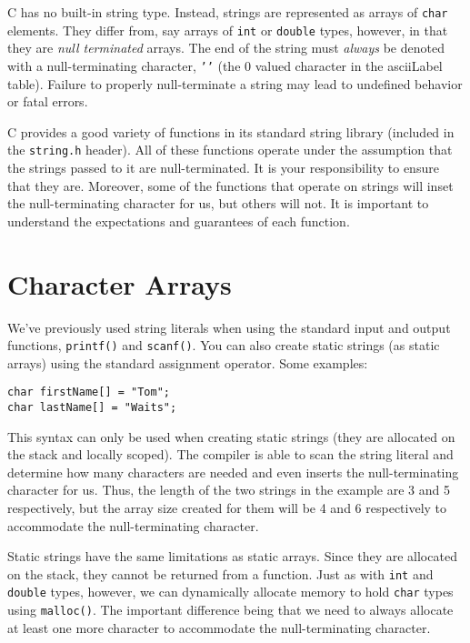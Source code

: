 

C has no built-in string type.  Instead, strings are represented
as arrays of \texttt{char} elements.  They differ from, say
arrays of \texttt{int} or \texttt{double} types, however,
in that they are \emph{null terminated} arrays.  The end of the
string must \emph{always} be denoted with a null-terminating 
character, \texttt{'\0'} (the 0 valued character in the \gls{asciiLabel}
table).  Failure to properly null-terminate a string may lead
to undefined behavior or fatal errors.  

C provides a good variety of functions in its standard string library
(included in the \texttt{string.h} header).  All of these 
functions operate under the assumption that the strings passed
to it are null-terminated.  It is your responsibility to ensure that
they are.  Moreover, some of the functions that operate on strings
will inset the null-terminating character for us, but others will not.
It is important to understand the expectations and guarantees
of each function.  



\section{Character Arrays}

We've previously used string literals when using the standard input
and output functions, \texttt{printf()} and \texttt{scanf()}.
You can also create static strings (as static arrays) using the standard
assignment operator.  Some examples:

\begin{verbatim}
char firstName[] = "Tom";
char lastName[] = "Waits";
\end{verbatim}

This syntax can only be used when creating static strings (they are
allocated on the stack and locally scoped).  The compiler is able
to scan the string literal and determine how many characters are
needed and even inserts the null-terminating character for us.  Thus, 
the length of the two strings in the example are 3 and 5 respectively, 
but the array size created for them will be 4 and 6 respectively to 
accommodate the null-terminating character.

Static strings have the same limitations as static arrays.  Since they
are allocated on the stack, they cannot be returned from
a function.  Just as with \texttt{int} and \texttt{double} 
types, however, we can dynamically allocate memory to hold \texttt{char}
types using \texttt{malloc()}.  The important difference being
that we need to always allocate at least one more character to accommodate
the null-terminating character.

